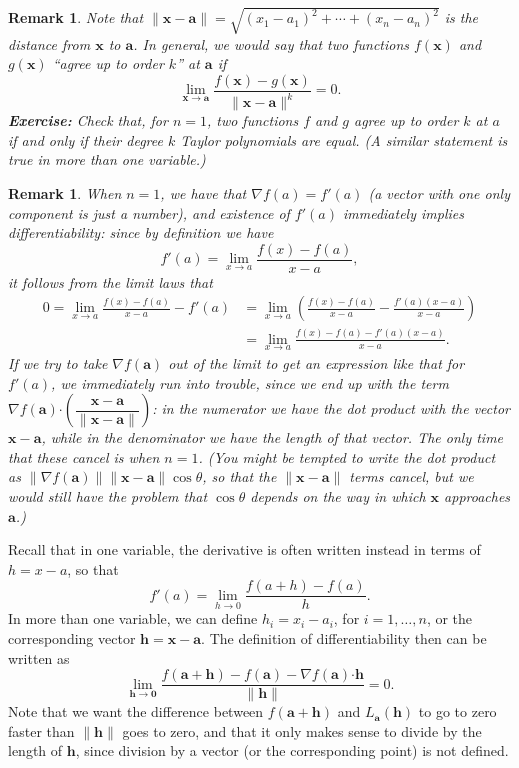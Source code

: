 \documentclass[12pt,letterpaper]{article}
\newtheorem{rem}[theorem]{Remark}
\newenvironment{remark}{\begin{rem}\rm}{\end{rem}}
\newcommand{\x}{\mathbf{x}}
\newcommand{\h}{\mathbf{h}}
\newcommand{\aaa}{\mathbf{a}}
\newcommand{\dotp}{\boldsymbol{\cdot}}
\begin{document}
\begin{remark}
Note that $\lVert \x-\aaa\rVert = \sqrt{(x_1-a_1)^2+\cdots +(x_n-a_n)^2}$ is the distance from $\x$ to $\aaa$. In general, we would say that two functions $f(\x)$ and $g(\x)$ ``agree up to order $k$'' at $\aaa$ if
\[
\lim_{\x\to\aaa}\frac{f(\x)-g(\x)}{\lVert \x-\aaa\rVert^k} = 0.
\]
{\bf Exercise:} Check that, for $n=1$, two functions $f$ and $g$ agree up to order $k$ at $a$ if and only if their degree $k$ Taylor polynomials are equal. (A similar statement is true in more than one variable.)
\end{remark}
\begin{remark}
When $n=1$, we have that $\nabla f(a) = f'(a)$ (a vector with one only component is just a number), and existence of $f'(a)$ immediately implies differentiability: since by definition we have
\[
f'(a) = \lim_{x\to a}\frac{f(x)-f(a)}{x-a},
\]
it follows from the limit laws that
\begin{align*}
0 = \lim_{x\to a}\frac{f(x)-f(a)}{x-a} - f'(a) &= \lim_{x\to a}\left(\frac{f(x)-f(a)}{x-a} - \frac{f'(a)(x-a)}{x-a}\right)\\
& = \lim_{x\to a}\frac{f(x)-f(a)-f'(a)(x-a)}{x-a}.
\end{align*}
If we try to take $\nabla f(\aaa)$ out of the limit to get an expression like that for $f'(a)$, we immediately run into trouble, since we end up with the term $\nabla f(\aaa)\dotp\left(\dfrac{\x-\aaa}{\lVert\x-\aaa\rVert}\right)$: in the numerator we have the dot product with the vector $\x-\aaa$, while in the denominator we have the length of that vector. The only time that these cancel is when $n=1$. (You might be tempted to write the dot product as $\lVert\nabla f(\aaa)\rVert\lVert\x-\aaa\rVert\cos\theta$, so that the $\lVert\x-\aaa\rVert$ terms cancel, but we would still have the problem that $\cos\theta$ depends on the way in which $\x$ approaches $\aaa$.)
\end{remark}
Recall that in one variable, the derivative is often written instead in terms of $h=x-a$, so that
\[
f'(a) = \lim_{h\to 0}\frac{f(a+h)-f(a)}{h}.
\]
In more than one variable, we can define $h_i = x_i-a_i$, for $i=1,\ldots, n$, or the corresponding vector $\h = \x-\aaa$. The definition of differentiability then can be written as
\[
\lim_{\h\to \mathbf{0}}\frac{f(\aaa+\h)-f(\aaa)-\nabla f(\aaa)\dotp\h}{\lVert \h\rVert} = 0.
\]
Note that we want the difference between $f(\aaa+\h)$ and $L_\aaa(\h)$ to go to zero faster than $\lVert \h\rVert$ goes to zero, and that it only makes sense to divide by the length of $\h$, since division by a vector (or the corresponding point) is not defined.
\end{document}
